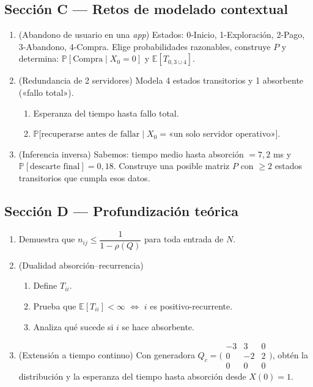 \documentclass[11pt,spanish]{article}
\newcommand{\E}{\mathbb{E}}
\newcommand{\Prob}{\mathbb{P}}
\begin{document}
\subsection*{Sección C — Retos de modelado contextual}
\begin{enumerate}[label=\textbf{C.\arabic*}]
  \item (Abandono de usuario en una \emph{app})  
        Estados: 0‐Inicio, 1-Exploración, 2-Pago, 3-Abandono, 4-Compra.  
        Elige probabilidades razonables, construye \(P\) y determina:
        \(\Prob[\text{Compra}\mid X_0=0]\) y \(\E[T_{0,3\cup4}]\).

  \item (Redundancia de 2 servidores)  
        Modela 4 estados transitorios y 1 absorbente («fallo total»).  
        \begin{enumerate}[label=\alph*)]
          \item Esperanza del tiempo hasta fallo total.  
          \item \(\Prob[\text{recuperarse antes de fallar}\mid X_0=\)«un solo servidor operativo»\(]\).
        \end{enumerate}

  \item (Inferencia inversa)  
        Sabemos: tiempo medio hasta absorción \(=7{,}2\) ms y
        \(\Prob[\text{descarte final}]=0{,}18\).
        Construye una posible matriz \(P\) con \(\ge2\) estados transitorios que cumpla esos datos.
\end{enumerate}

\subsection*{Sección D — Profundización teórica}
\begin{enumerate}[label=\textbf{D.\arabic*}]
  \item Demuestra que \(n_{ij}\le \dfrac{1}{1-\rho(Q)}\) para toda entrada de \(N\).  
  \item (Dualidad absorción–recurrencia)  
        \begin{enumerate}[label=\alph*)]
          \item Define \(T_{ii}\).  
          \item Prueba que \(\E[T_{ii}]<\infty\) \(\Leftrightarrow\) \(i\) es positivo-recurrente.  
          \item Analiza qué sucede si \(i\) se hace absorbente.
        \end{enumerate}

  \item (Extensión a tiempo continuo)  
        Con generadora
        \(Q_c=\bigl(\begin{smallmatrix}-3&3&0\\0&-2&2\\0&0&0\end{smallmatrix}\bigr)\),
        obtén la distribución y la esperanza del tiempo hasta absorción desde
        \(X(0)=1\).
\end{enumerate}
\end{document}
